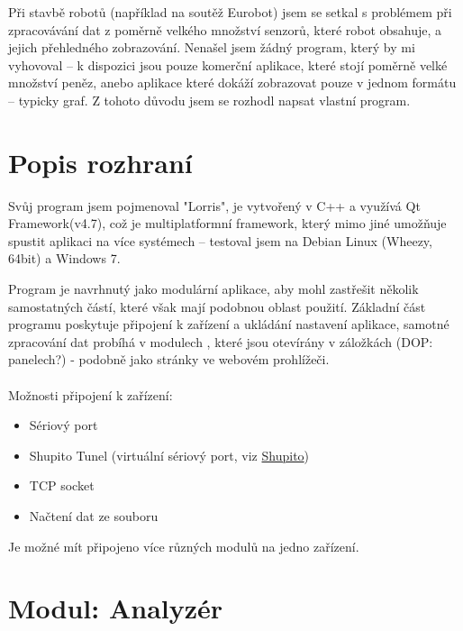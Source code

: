 \documentclass[12pt, a4paper, oneside]{article}
\begin{document}
Při stavbě robotů (například na soutěž Eurobot) jsem se setkal s problémem  při zpracovávání dat z poměrně velkého množství senzorů, které robot obsahuje, a jejich přehledného zobrazování. Nenašel jsem žádný program, který by mi vyhovoval -- k dispozici jsou pouze komerční aplikace, které stojí poměrně velké množství peněz, anebo aplikace které dokáží zobrazovat pouze v jednom formátu -- typicky graf. Z tohoto důvodu jsem se rozhodl napsat vlastní program.

\section*{Popis rozhraní}
Svůj program jsem pojmenoval "Lorris", je vytvořený v C++ a využívá Qt Framework(v4.7)\cite{qtfw}, což je multiplatformní framework, který mimo jiné umožňuje spustit aplikaci na více systémech -- testoval jsem na Debian Linux (Wheezy, 64bit) a Windows 7.  

Program je navrhnutý jako modulární aplikace, aby mohl zastřešit několik samostatných částí, které však mají podobnou oblast použití. Základní část programu poskytuje připojení k zařízení a ukládání nastavení aplikace, samotné zpracování dat probíhá v modulech
, které jsou otevírány v záložkách (DOP: panelech?) - podobně jako stránky ve webovém prohlížeči.\\
\\
Možnosti připojení k zařízení:
\begin{itemize}
    \item Sériový port
    \item Shupito Tunel (virtuální sériový port, viz \hyperref[label_name]{Shupito})
    \item TCP socket\cite{tcp_sock}
    \item Načtení dat ze souboru
\end{itemize}
Je možné mít připojeno více různých modulů na jedno zařízení.  

\newpage
\section*{Modul: Analyzér}
\end{document}
